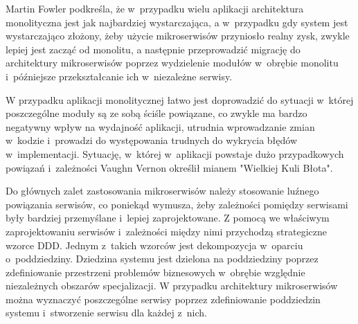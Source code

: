 \par
Martin Fowler podkreśla, że w~przypadku wielu aplikacji architektura monolityczna jest jak najbardziej wystarczająca,
a w~przypadku gdy system jest wystarczająco złożony, żeby użycie mikroserwisów przyniosło realny zysk, zwykle lepiej jest zacząć od monolitu,
a następnie przeprowadzić migrację do architektury mikroserwisów poprzez wydzielenie modułów w~obrębie monolitu
i~późniejsze przekształcanie ich w~niezależne serwisy\cite{url:monolith-first}.

\par
W przypadku aplikacji monolitycznej łatwo jest doprowadzić do sytuacji w~której poszczególne moduły są ze sobą ściśle powiązane,
co zwykle ma bardzo negatywny wpływ na wydajność aplikacji, utrudnia wprowadzanie zmian w~kodzie i~prowadzi do występowania trudnych do wykrycia błędów w~implementacji.
Sytuację, w~której w~aplikacji powstaje dużo przypadkowych powiązań i~zależności Vaughn Vernon określił mianem "Wielkiej Kuli Błota"\cite{book:ddd-kompendium}.

\par
Do głównych zalet zastosowania mikroserwisów należy stosowanie luźnego powiązania serwisów,
co poniekąd wymusza, żeby zależności pomiędzy serwisami były bardziej przemyślane i~lepiej zaprojektowane.
Z pomocą we właściwym zaprojektowaniu serwisów i~zależności między nimi przychodzą strategiczne wzorce DDD.
Jednym z~takich wzorców jest dekompozycja w~oparciu o~poddziedziny\cite{book:ddd-evans}.
Dziedzina systemu jest dzielona na poddziedziny poprzez zdefiniowanie przestrzeni problemów biznesowych w~obrębie względnie niezależnych obszarów specjalizacji.
W przypadku architektury mikroserwisów można wyznaczyć poszczególne serwisy poprzez zdefiniowanie poddziedzin systemu
i~stworzenie serwisu dla każdej z~nich\cite{book:microservices-patterns}.

\thispagestyle{normal}
